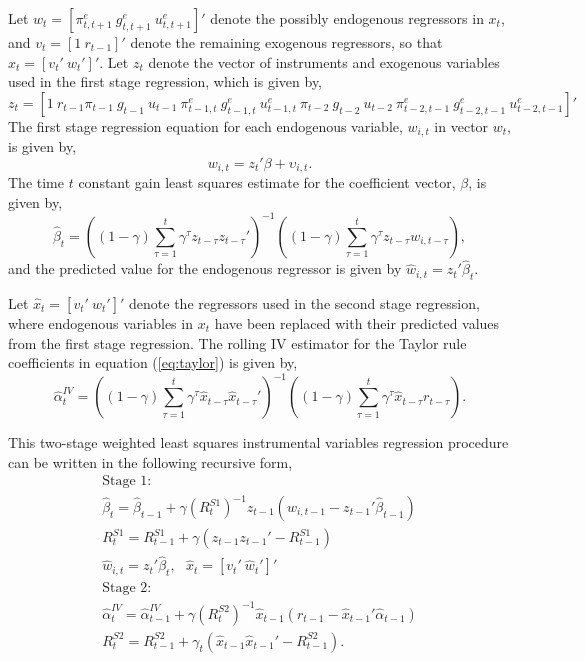 \documentclass[12pt]{article}
\newcommand{\beq}{\begin{equation}}
\newcommand{\eeq}{\end{equation}}
\newcommand{\bdm}{\begin{displaymath}}
\newcommand{\edm}{\end{displaymath}}
\begin{document}
Let $w_{t} = [\pi_{t,t+1}^e~ g_{t,t+1}^e~ u_{t,t+1}^e]'$ denote the possibly endogenous regressors in $x_{t}$, and $v_{t} = [1~ r_{t-1}]'$ denote the remaining exogenous regressors, so that $x_{t} = [v_t'~ w_{t}']'$.  Let $z_{t}$ denote the vector of instruments and exogenous variables used in the first stage regression, which is given by,
\bdm z_{t} = [1~ r_{t-1} \pi_{t-1}~ g_{t-1}~ u_{t-1}~ \pi_{t-1,t}^e~ g_{t-1,t}^e~ u_{t-1,t}^e~ \pi_{t-2}~ g_{t-2}~ u_{t-2}~ \pi_{t-2,t-1}^e~ g_{t-2,t-1}^e~ u_{t-2,t-1}^e]' \edm
The first stage regression equation for each endogenous variable, $w_{i,t}$ in vector $w_t$, is given by,
\bdm w_{i,t} = z_{t}' \beta + \upsilon_{i,t}. \edm
The time $t$ constant gain least squares estimate for the coefficient vector, $\beta$, is given by,
\beq \label{eq:iv1} \hat{\beta}_t = \left( (1-\gamma)  \sum_{\tau=1}^{t} \gamma^{\tau} z_{t-\tau} z_{t-\tau}' \right)^{-1}  \left( (1-\gamma)  \sum_{\tau=1}^{t} \gamma^{\tau} z_{t-\tau}  w_{i,t-\tau} \right), \eeq
and the predicted value for the endogenous regressor is given by $\hat{w}_{i,t} = z_{t}' \hat{\beta}_t.$

Let $\hat{x}_t = [v_t'~ \hat{w}_{t}']'$ denote the regressors used in the second stage regression, where endogenous variables in $x_{t}$ have been replaced with their predicted values from the first stage regression.  The rolling IV estimator for the Taylor rule coefficients in equation (\ref{eq:taylor}) is given by,
\beq \label{eq:iv2} \hat{\alpha}_t^{IV} = \left( (1-\gamma)  \sum_{\tau=1}^{t} \gamma^{\tau} \hat{x}_{t-\tau} \hat{x}_{t-\tau}' \right)^{-1}  \left( (1-\gamma)  \sum_{\tau=1}^{t} \gamma^{\tau} \hat{x}_{t-\tau}  r_{t-\tau} \right). \eeq

This two-stage weighted least squares instrumental variables regression procedure can be written in the following recursive form,
\beq \label{lniv} \begin{array}{c}
\mbox{Stage 1:} \\ [0.5pc]
 \hat{\beta}_t = \hat{\beta}_{t-1} + \gamma \left(R_t^{S1}\right)^{-1} z_{t-1} \left(w_{i,t-1} - z_{t-1}'\hat{\beta}_{t-1}\right) \\ [0.5pc]
 R_t^{S1} = R_{t-1}^{S1} + \gamma \left(z_{t-1} z_{t-1}' - R_{t-1}^{S1}\right) \\ [0.5pc]
 \hat{w}_{i,t} = z_{t}' \hat{\beta}_t,~~~  \hat{x}_t = [v_t'~ \hat{w}_t']' \\ [1pc]
\mbox{Stage 2:} \\ [0.5pc]
 \hat{\alpha}_t^{IV} = \hat{\alpha}_{t-1}^{IV} + \gamma \left(R_t^{S2}\right)^{-1} \hat{x}_{t-1} \left(r_{t-1} - \hat{x}_{t-1}'\hat{\alpha}_{t-1}\right) \\ [0.5pc]
 R_t^{S2} = R_{t-1}^{S2} + \gamma_t \left(\hat{x}_{t-1} \hat{x}_{t-1}' - R_{t-1}^{S2}\right). 
\end{array} \eeq
\end{document}
